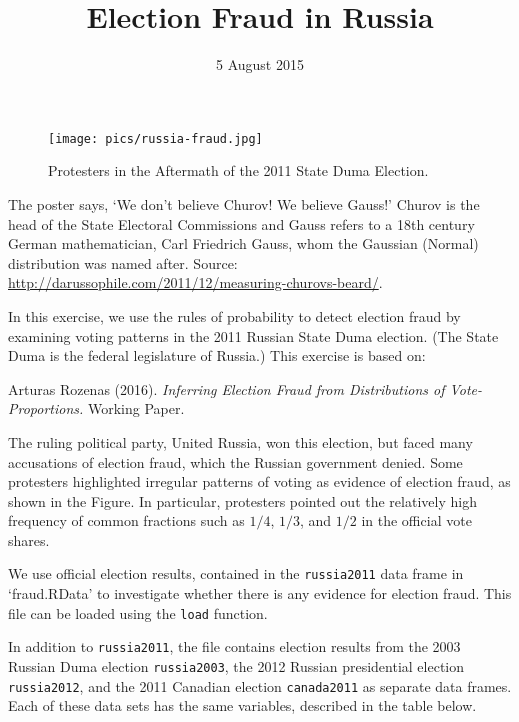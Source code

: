 \documentclass[]{article}
\title{Election Fraud in Russia}
\author{}
\date{5 August 2015}
\begin{document}
\maketitle


\begin{figure}[htbp]
\centering
\texttt{[image: pics/russia-fraud.jpg]}
\caption{Protesters in the Aftermath of the 2011 State Duma Election.}
\end{figure}

The poster says, `We don't believe Churov! We believe Gauss!' Churov is
the head of the State Electoral Commissions and Gauss refers to a 18th
century German mathematician, Carl Friedrich Gauss, whom the Gaussian
(Normal) distribution was named after. Source:
\href{http://darussophile.com/2011/12/measuring-churovs-beard/}{\url{http://darussophile.com/2011/12/measuring-churovs-beard/}}.

In this exercise, we use the rules of probability to detect election
fraud by examining voting patterns in the 2011 Russian State Duma
election. (The State Duma is the federal legislature of Russia.) This
exercise is based on:

Arturas Rozenas (2016). \emph{Inferring Election Fraud from
Distributions of Vote-Proportions.} Working Paper.

The ruling political party, United Russia, won this election, but faced
many accusations of election fraud, which the Russian government denied.
Some protesters highlighted irregular patterns of voting as evidence of
election fraud, as shown in the Figure. In particular, protesters
pointed out the relatively high frequency of common fractions such as
$1/4$, $1/3$, and $1/2$ in the official vote shares.

We use official election results, contained in the \texttt{russia2011}
data frame in `fraud.RData' to investigate whether there is any evidence
for election fraud. This file can be loaded using the \texttt{load}
function.

In addition to \texttt{russia2011}, the file contains election results
from the 2003 Russian Duma election \texttt{russia2003}, the 2012
Russian presidential election \texttt{russia2012}, and the 2011 Canadian
election \texttt{canada2011} as separate data frames. Each of these data
sets has the same variables, described in the table below.
\end{document}
